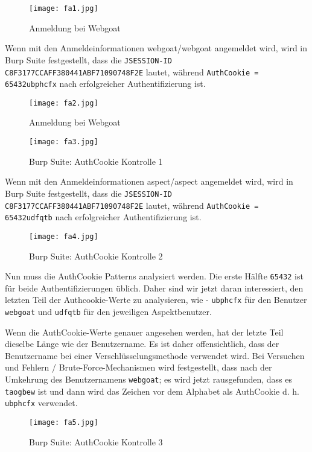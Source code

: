 \begin{figure}[h]
	\centering
	\texttt{[image: fa1.jpg]}
	\caption{Anmeldung bei Webgoat}
\end{figure}

Wenn mit den Anmeldeinformationen webgoat/webgoat angemeldet wird, wird in Burp Suite festgestellt, dass die \texttt{JSESSION-ID C8F3177CCAFF380441ABF71090748F2E} lautet, während \texttt{AuthCookie = 65432ubphcfx} nach erfolgreicher Authentifizierung ist.

\begin{figure}[h]
	\centering
	\texttt{[image: fa2.jpg]}
	\caption{Anmeldung bei Webgoat}
\end{figure}

\newpage

\begin{figure}[h]
	\centering
	\texttt{[image: fa3.jpg]}
	\caption{Burp Suite: AuthCookie Kontrolle 1}
\end{figure}

Wenn mit den Anmeldeinformationen aspect/aspect angemeldet wird, wird in Burp Suite festgestellt, dass die \texttt{JSESSION-ID C8F3177CCAFF380441ABF71090748F2E} lautet, während \texttt{AuthCookie = 65432udfqtb} nach erfolgreicher Authentifizierung ist.

\begin{figure}[h]
	\centering
	\texttt{[image: fa4.jpg]}
	\caption{Burp Suite: AuthCookie Kontrolle 2}
\end{figure}

Nun muss die AuthCookie Patterns analysiert werden. Die erste Hälfte \texttt{65432} ist für beide Authentifizierungen üblich. Daher sind wir jetzt daran interessiert, den letzten Teil der Authcookie-Werte zu analysieren, wie - \texttt{ubphcfx} für den Benutzer \texttt{webgoat} und \texttt{udfqtb} für den jeweiligen Aspektbenutzer.

Wenn die AuthCookie-Werte genauer angesehen werden, hat der letzte Teil dieselbe Länge wie der Benutzername. Es ist daher offensichtlich, dass der Benutzername bei einer Verschlüsselungsmethode verwendet wird. Bei Versuchen und Fehlern / Brute-Force-Mechanismen wird festgestellt, dass nach der Umkehrung des Benutzernamens \texttt{webgoat}; es wird jetzt rausgefunden, dass es \texttt{taogbew} ist und dann wird das Zeichen vor dem Alphabet als AuthCookie d. h. \texttt{ubphcfx} verwendet. 

\newpage
\begin{figure}[h]
	\centering
	\texttt{[image: fa5.jpg]}
	\caption{Burp Suite: AuthCookie Kontrolle 3}
\end{figure}

